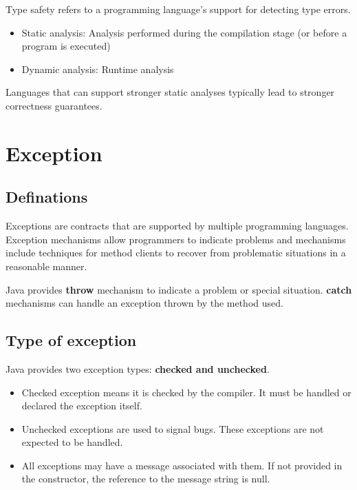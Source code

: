 \documentclass[letterpaper,12pt]{article}
\begin{document}
Type safety refers to a programming language's support for detecting type
errors.

\begin{itemize}
      \item Static analysis: Analysis performed during the compilation stage (or before a
            program is executed)
      \item Dynamic analysis: Runtime analysis
\end{itemize}
Languages that can support stronger static analyses typically lead to stronger correctness guarantees.

\section{Exception}
\subsection{Definations}
Exceptions are contracts that are supported by multiple programming languages.
Exception mechanisms allow programmers to indicate problems and mechanisms
include techniques for method clients to recover from problematic situations in
a reasonable manner.

Java provides \textbf{throw} mechanism to indicate a problem or special
situation. \textbf{catch} mechanisms can handle an exception thrown by the
method used.
\subsection{Type of exception}
Java provides two exception types: \textbf{checked and unchecked}.
\begin{itemize}
      \item Checked exception means it is checked by the compiler. It must be handled or
            declared the exception itself.
      \item Unchecked exceptions are used to signal bugs. These exceptions are not expected
            to be handled.
      \item All exceptions may have a message associated with them. If not provided in the
            constructor, the reference to the message string is null.
\end{itemize}
\end{document}

